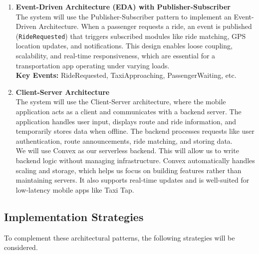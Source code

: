 \documentclass[a4paper,12pt]{article}
\begin{document}
\begin{enumerate}
    \item \textbf{Event-Driven Architecture (EDA) with Publisher-Subscriber}\\
    The system will use the Publisher-Subscriber pattern to implement an Event-Driven Architecture. When a passenger requests a ride, an event is published (\texttt{RideRequested}) that triggers subscribed modules like ride matching, GPS location updates, and notifications. This design enables loose coupling, scalability, and real-time responsiveness, which are essential for a transportation app operating under varying loads.\\
    \textbf{Key Events:} RideRequested, TaxiApproaching, PassengerWaiting, etc.

    \item \textbf{Client-Server Architecture}\\
    The system will use the Client-Server architecture, where the mobile application acts as a client and communicates with a backend server. The application handles user input, displays route and ride information, and temporarily stores data when offline. The backend processes requests like user authentication, route announcements, ride matching, and storing data.\\
    We will use Convex as our serverless backend. This will allow us to write backend logic without managing infrastructure. Convex automatically handles scaling and storage, which helps us focus on building features rather than maintaining servers. It also supports real-time updates and is well-suited for low-latency mobile apps like Taxi Tap. 
\end{enumerate}

\subsection{Implementation Strategies}
To complement these architectural patterns, the following strategies will be considered.
\end{document}
